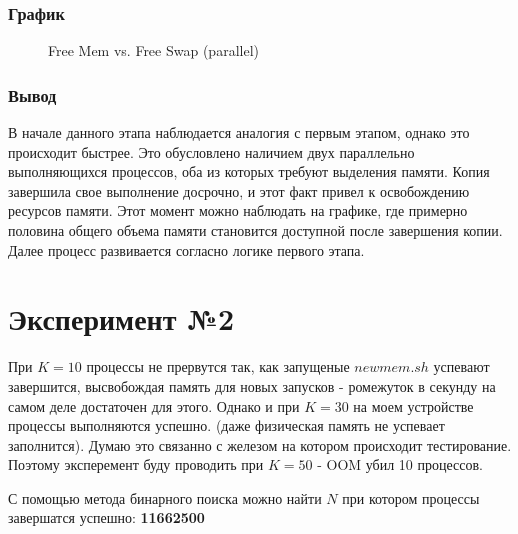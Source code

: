 \documentclass[12pt,a4paper]{article}
\begin{document}
\subsubsection{График}
\begin{figure}[htbp]
  \centering
  
  \caption{Free Mem vs. Free Swap (parallel)}
\end{figure}

\subsubsection{Вывод}

В начале данного этапа наблюдается аналогия с первым этапом, однако это происходит быстрее. Это обусловлено наличием двух параллельно выполняющихся процессов, оба из которых требуют выделения памяти. Копия завершила свое выполнение досрочно, и этот факт привел к освобождению ресурсов памяти. Этот момент можно наблюдать на графике, где примерно половина общего объема памяти становится доступной после завершения копии. Далее процесс развивается согласно логике первого этапа.

\section{Эксперимент №2}

При $K=10$ процессы не прервутся так, как запущеные $newmem.sh$ успевают завершится, высвобождая память для новых запусков - ромежуток в секунду на самом деле достаточен для этого. Однако и при $K=30$ на моем устройстве процессы выполняются успешно. (даже физическая память не успевает заполнится). Думаю это связанно с железом на котором происходит тестирование. Поэтому эксперемент буду проводить при $K=50$ - OOM убил 10 процессов.

С помощью метода бинарного поиска можно найти $N$ при котором процессы завершатся успешно: \textbf{11662500}
\end{document}
